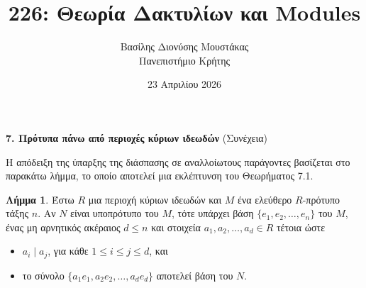 \documentclass[12pt,a4paper,reqno]{amsart}
\title{226: Θεωρία Δακτυλίων και Modules}
\author[Β.~Δ. Μουστακας]{Βασίλης Διονύσης Μουστάκας \\ Πανεπιστήμιο Κρήτης}
\date{23 Απριλίου 2026}
\theoremstyle{definition}
\newtheorem{lemma}[theorem]{Λήμμα}
\theoremstyle{remark}
\numberwithin{theorem}{section}
\numberwithin{exercise}{section}
\numberwithin{equation}{section}
\begin{document}
\begingroup
\def\uppercasenonmath#1{} %
\let\MakeUppercase\relax %
\maketitle
\endgroup

\setcounter{section}{7}
\setcounter{theorem}{4}
\setcounter{equation}{5}
\begin{center}
    \textbf{7. Πρότυπα πάνω από περιοχές κύριων ιδεωδών
} (Συνέχεια)
\end{center}

Η απόδειξη της ύπαρξης της διάσπασης σε αναλλοίωτους παράγοντες βασίζεται στο παρακάτω λήμμα, το οποίο αποτελεί μια εκλέπτυνση του Θεωρήματος 7.1.
\begin{lemma}
    \label{lem:aligned_bases}
    Έστω $R$ μια περιοχή κύριων ιδεωδών και $M$ ένα ελεύθερο $R$-πρότυπο τάξης $n$. Αν $N$ είναι υποπρότυπο του $M$, τότε υπάρχει βάση $\{e_1, e_2, \dots, e_n\}$ του $M$, ένας μη αρνητικός ακέραιος $d \le n$ και στοιχεία $a_1, a_2, \dots, a_d \in R$ τέτοια ώστε 
    \begin{itemize}
        \item $a_i \mid a_j$, για κάθε $1 \le i \le j \le d$, και 
        \item το σύνολο $\{a_1e_1, a_2e_2, \dots, a_de_d\}$ αποτελεί βάση του $N$.
    \end{itemize}
\end{lemma}
\end{document}
